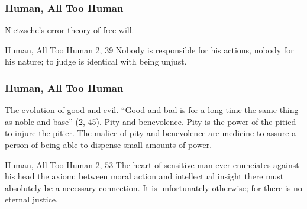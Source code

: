 \documentclass[xcolor=dvipsnames]{beamer}
\begin{document}
\begin{frame}
  \frametitle{Human, All Too Human}
  Nietzsche's error theory of free will.
  \begin{block}{Human, All Too Human 2, 39}
    Nobody is responsible for his actions, nobody for his nature; to
    judge is identical with being unjust.
  \end{block}
\end{frame}

\begin{frame}
  \frametitle{Human, All Too Human}
  The evolution of good and evil. ``Good and bad is for a long time
  the same thing as noble and base'' (2, 45). Pity and benevolence.
  Pity is the power of the pitied to injure the pitier. The malice of
  pity and benevolence are medicine to assure a person of being able
  to dispense small amounts of power.
  \begin{block}{Human, All Too Human 2, 53}
    The heart of sensitive man ever enunciates against his head the
    axiom: between moral action and intellectual insight there must
    absolutely be a necessary connection. It is unfortunately
    otherwise; for there is no eternal justice.
  \end{block}
\end{frame}

\end{document}
